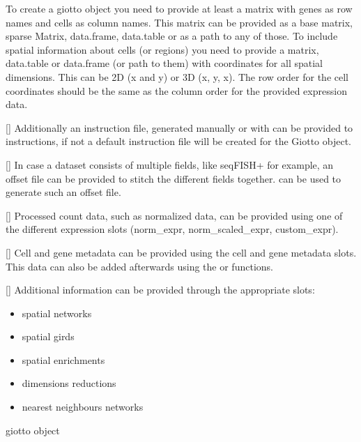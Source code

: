 \documentclass[a4paper]{book}
\begin{document}
%
\begin{Details} To create a giotto object you need to provide at least a matrix with genes as
row names and cells as column names. This matrix can be provided as a base matrix, sparse Matrix, data.frame,
data.table or as a path to any of those. 
To include spatial information about cells (or regions) you need to provide a matrix, data.table or data.frame (or path to them)
with coordinates for all spatial dimensions. This can be 2D (x and y) or 3D (x, y, x).
The row order for the cell coordinates should be the same as the column order for the provided expression data.

[] Additionally an instruction file, generated manually or with 
can be provided to instructions, if not a default instruction file will be created
for the Giotto object.

[] In case a dataset consists of multiple fields, like seqFISH+ for example,
an offset file can be provided to stitch the different fields together. 
can be used to generate such an offset file.

[] Processed count data, such as normalized data, can be provided using
one of the different expression slots (norm\_expr, norm\_scaled\_expr, custom\_expr).

[] Cell and gene metadata can be provided using the cell and gene metadata slots.
This data can also be added afterwards using the  or  functions.

[] Additional information can be provided through the appropriate slots:
\begin{itemize}

\item{} spatial networks
\item{} spatial girds
\item{} spatial enrichments
\item{} dimensions reductions
\item{} nearest neighbours networks

\end{itemize}

\end{Details}
%
\begin{Value}
giotto object
\end{Value}
\end{document}
